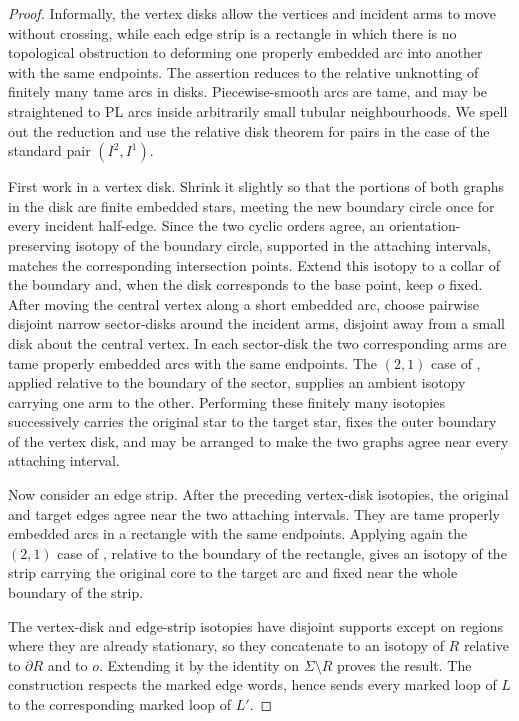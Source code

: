 \documentclass[11pt,a4paper,reqno]{article}
\theoremstyle{definition}
\theoremstyle{remark}
\begin{document}
\begin{proof}
Informally, the vertex disks allow the vertices and incident arms to move without crossing, while each edge strip is a rectangle in which there is no topological obstruction to deforming one properly embedded arc into another with the same endpoints.
The assertion reduces to the relative unknotting of finitely many tame arcs in disks. Piecewise-smooth arcs are tame, and may be straightened to PL arcs inside arbitrarily small tubular neighbourhoods. We spell out the reduction and use the relative disk theorem for pairs \cite[Theorem~4.20]{RourkeSandersonPL} in the case of the standard pair $(I^2,I^1)$.

First work in a vertex disk. Shrink it slightly so that the portions of both graphs in the disk are finite embedded stars, meeting the new boundary circle once for every incident half-edge. Since the two cyclic orders agree, an orientation-preserving isotopy of the boundary circle, supported in the attaching intervals, matches the corresponding intersection points. Extend this isotopy to a collar of the boundary and, when the disk corresponds to the base point, keep $o$ fixed. After moving the central vertex along a short embedded arc, choose pairwise disjoint narrow sector-disks around the incident arms, disjoint away from a small disk about the central vertex. In each sector-disk the two corresponding arms are tame properly embedded arcs with the same endpoints. The $(2,1)$ case of \cite[Theorem~4.20]{RourkeSandersonPL}, applied relative to the boundary of the sector, supplies an ambient isotopy carrying one arm to the other. Performing these finitely many isotopies successively carries the original star to the target star, fixes the outer boundary of the vertex disk, and may be arranged to make the two graphs agree near every attaching interval.

Now consider an edge strip. After the preceding vertex-disk isotopies, the original and target edges agree near the two attaching intervals. They are tame properly embedded arcs in a rectangle with the same endpoints. Applying again the $(2,1)$ case of \cite[Theorem~4.20]{RourkeSandersonPL}, relative to the boundary of the rectangle, gives an isotopy of the strip carrying the original core to the target arc and fixed near the whole boundary of the strip.

The vertex-disk and edge-strip isotopies have disjoint supports except on regions where they are already stationary, so they concatenate to an isotopy of $R$ relative to $\partial R$ and to $o$. Extending it by the identity on $\Sigma\setminus R$ proves the result. The construction respects the marked edge words, hence sends every marked loop of $L$ to the corresponding marked loop of $L'$.
\end{proof}
\end{document}
